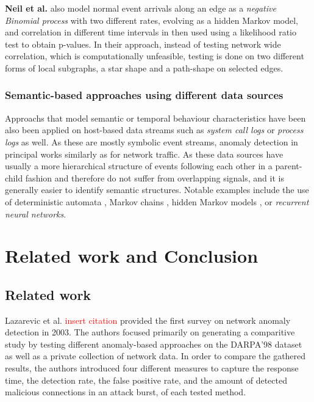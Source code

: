 \documentclass[a4paper,12pt,twoside]{report}
\begin{document}
\textbf{Neil et al.}  \cite{neil2013scan} also model normal event arrivals along an edge as a \textit{negative Binomial process} with two different rates, evolving as a hidden Markov model, and correlation in different time intervals in then used  using a likelihood ratio test to obtain p-values. In their approach, instead of testing network wide correlation, which is computationally unfeasible, testing is done on two different forms of local subgraphs, a star shape and a path-shape on selected edges. 


\subsection{Semantic-based approaches using different data sources}

Approachs that model semantic or temporal behaviour characteristics have been also been applied on host-based data streams such as \textit{system call logs} or \textit{process logs} as well. As these are mostly symbolic event streams, anomaly detection in principal works similarly as for network traffic. As these data sources have usually a more hierarchical structure of events following each other in a parent-child fashion and therefore do not suffer from overlapping signals, and it is generally easier to identify semantic structures. Notable examples include the use of deterministic automata \cite{warrender1999detecting}, Markov chains \cite{ye2000markov}, hidden Markov models \cite{yeung2003host,hu2009simple}, or \textit{recurrent neural networks}\cite{du2017deeplog}.


\chapter{Related work and Conclusion}

\section{Related work}


Lazarevic et al. \textcolor{red}{insert citation} provided the first survey on network anomaly detection in 2003. The authors focused primarily on generating a comparitive study by testing different anomaly-based approaches on the DARPA'98 dataset as well as a private collection of network data. In order to compare the gathered results, the authors introduced four different measures to capture the response time, the detection rate, the false positive rate, and the amount of detected malicious connections in an attack burst, of each tested method. 
\end{document}
